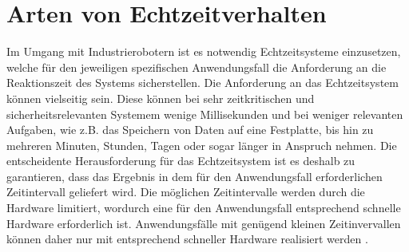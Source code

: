 


\section{Arten von Echtzeitverhalten}
Im Umgang mit Industrierobotern ist es notwendig Echtzeitsysteme einzusetzen, welche für den jeweiligen spezifischen Anwendungsfall die Anforderung an die Reaktionszeit des Systems sicherstellen. Die Anforderung an das Echtzeitsystem können vielseitig sein. Diese können bei sehr zeitkritischen und sicherheitsrelevanten Systemem wenige Millisekunden und bei weniger relevanten Aufgaben, wie z.B. das Speichern von Daten auf eine Festplatte, bis hin zu mehreren Minuten, Stunden, Tagen oder sogar länger in Anspruch nehmen. Die entscheidente Herausforderung für das Echtzeitsystem ist es deshalb zu garantieren, dass das Ergebnis in dem für den Anwendungsfall erforderlichen Zeitintervall geliefert wird. Die möglichen Zeitintervalle werden durch die Hardware limitiert, wordurch eine für den Anwendungsfall entsprechend schnelle Hardware erforderlich ist. Anwendungsfälle mit genügend kleinen Zeitinvervallen können daher nur mit entsprechend schneller Hardware realisiert werden \cite{echtzeitsystem_2020}.

